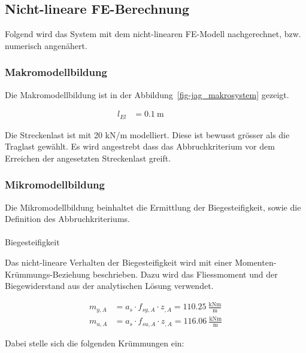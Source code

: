 \documentclass[
  11pt,
  letterpaper,
]{scrreprt}
\makeatletter
\let\oldparagraph\paragraph
\renewcommand{\paragraph}{
    \@ifstar
      \xxxParagraphStar
      \xxxParagraphNoStar
  }
\newcommand{\xxxParagraphStar}[1]{\oldparagraph*{#1}\mbox{}}
\newcommand{\xxxParagraphNoStar}[1]{\oldparagraph{#1}\mbox{}}
\makeatother
\begin{document}
\subsection{Nicht-lineare
FE-Berechnung}\label{nicht-lineare-fe-berechnung}

Folgend wird das System mit dem nicht-linearen FE-Modell nachgerechnet,
bzw. numerisch angenähert.

\subsubsection{Makromodellbildung}\label{makromodellbildung-3}

Die Makromodellbildung ist in der Abbildung~\ref{fig-jag_makrosystem}
gezeigt.

\[
\begin{aligned}
l_{El}& = 0.1 \ \mathrm{m} \quad &  \quad &  
 \end{aligned}
\]

Die Streckenlast ist mit 20 kN/m modelliert. Diese ist bewusst grösser
als die Traglast gewählt. Es wird angestrebt dass das Abbruchkriterium
vor dem Erreichen der angesetzten Streckenlast greift.

\subsubsection{Mikromodellbildung}\label{mikromodellbildung-3}

Die Mikromodellbildung beinhaltet die Ermittlung der Biegesteifigkeit,
sowie die Definition des Abbruchkriteriums.

\paragraph{Biegesteifigkeit}\label{biegesteifigkeit-3}

Das nicht-lineare Verhalten der Biegesteifigkeit wird mit einer
Momenten-Krümmungs-Beziehung beschrieben. Dazu wird das Fliessmoment und
der Biegewiderstand aus der analytischen Lösung verwendet.

\[
\begin{aligned}
m_{y , A}& = a_{s} \cdot f_{sy , A} \cdot z_{, A} = 110.25 \ \frac{\mathrm{kNm}}{\mathrm{m}} \\ 
m_{u , A}& = a_{s} \cdot f_{su , A} \cdot z_{, A} = 116.06 \ \frac{\mathrm{kNm}}{\mathrm{m}} \end{aligned}
\]

Dabei stelle sich die folgenden Krümmungen ein:
\end{document}
